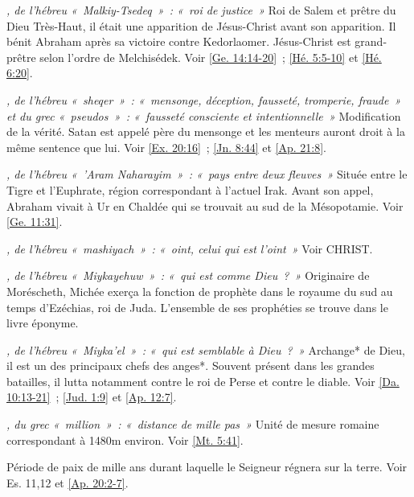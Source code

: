 \begin{multicols}{2}
\textit{, de l'hébreu «~Malkiy-Tsedeq~»~: «~roi de justice~»}\newline
Roi de Salem et prêtre du Dieu Très-Haut, il était une apparition de Jésus-Christ avant son apparition. Il bénit Abraham après sa victoire contre Kedorlaomer. Jésus-Christ est grand-prêtre selon l'ordre de Melchisédek. Voir \vref{Ge. 14:14-20}~; \vref{Hé. 5:5-10} et \vref{Hé. 6:20}.

\textit{, de l'hébreu «~sheqer~»~: «~mensonge, déception, fausseté, tromperie, fraude~» et du grec «~pseudos~»~: «~fausseté consciente et intentionnelle~»}\newline
Modification de la vérité. Satan est appelé père du mensonge et les menteurs auront droit à la même sentence que lui. Voir \vref{Ex. 20:16}~; \vref{Jn. 8:44} et \vref{Ap. 21:8}.

\textit{, de l'hébreu «~'Aram Naharayim~»~: «~pays entre deux fleuves~»}\newline
Située entre le Tigre et l'Euphrate, région correspondant à l'actuel Irak. Avant son appel, Abraham vivait à Ur en Chaldée qui se trouvait au sud de la Mésopotamie. Voir \vref{Ge. 11:31}.

\textit{, de l'hébreu «~mashiyach~»~: «~oint, celui qui est l'oint~»}\newline
Voir CHRIST.

\textit{, de l'hébreu «~Miykayehuw~»~: «~qui est comme Dieu~?~»}\newline
Originaire de Moréscheth, Michée exerça la fonction de prophète dans le royaume du sud au temps d'Ezéchias, roi de Juda. L'ensemble de ses prophéties se trouve dans le livre éponyme.

\textit{, de l'hébreu «~Miyka'el~»~: «~qui est semblable à Dieu~?~»}\newline
Archange* de Dieu, il est un des principaux chefs des anges*. Souvent présent dans les grandes batailles, il lutta notamment contre le roi de Perse et contre le diable. Voir \vref{Da. 10:13-21}~; \vref{Jud. 1:9} et \vref{Ap. 12:7}.

\textit{, du grec «~million~»~: «~distance de mille pas~»}\newline
Unité de mesure romaine correspondant à 1480m environ. Voir \vref{Mt. 5:41}.

\textit{}\newline
Période de paix de mille ans durant laquelle le Seigneur régnera sur la terre. Voir Es. 11,12 et \vref{Ap. 20:2-7}.


\end{multicols}
